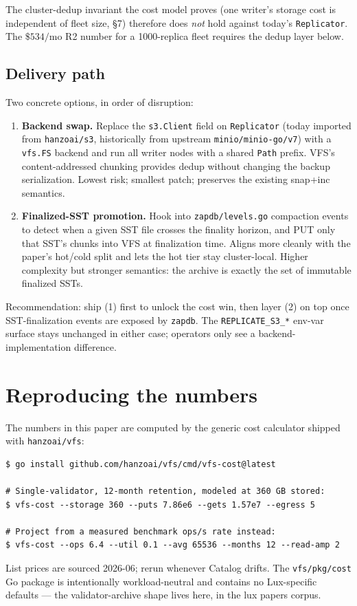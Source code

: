 \documentclass[11pt,a4paper]{article}
\begin{document}
\noindent
The cluster-dedup invariant the cost model proves (one writer's
storage cost is independent of fleet size, \S7) therefore does
\emph{not} hold against today's \texttt{Replicator}. The $\$534/\text{mo}$
R2 number for a 1000-replica fleet requires the dedup layer below.

\subsection*{Delivery path}

Two concrete options, in order of disruption:

\begin{enumerate}
  \item \textbf{Backend swap.} Replace the \texttt{s3.Client} field
    on \texttt{Replicator} (today imported from \texttt{hanzoai/s3},
    historically from upstream \texttt{minio/minio-go/v7}) with a
    \texttt{vfs.FS} backend and run all writer nodes with a shared
    \texttt{Path} prefix. VFS's content-addressed chunking provides
    dedup without changing the backup serialization. Lowest risk;
    smallest patch; preserves the existing snap+inc semantics.
  \item \textbf{Finalized-SST promotion.} Hook into
    \texttt{zapdb/levels.go} compaction events to detect when a given
    SST file crosses the finality horizon, and PUT only that SST's
    chunks into VFS at finalization time. Aligns more cleanly with the
    paper's hot/cold split and lets the hot tier stay
    cluster-local. Higher complexity but stronger semantics: the
    archive is exactly the set of immutable finalized SSTs.
\end{enumerate}

\noindent
Recommendation: ship (1) first to unlock the cost win, then layer (2)
on top once SST-finalization events are exposed by \texttt{zapdb}. The
\texttt{REPLICATE\_S3\_*} env-var surface stays unchanged in either case;
operators only see a backend-implementation difference.

\section*{Reproducing the numbers}

The numbers in this paper are computed by the generic cost calculator
shipped with \texttt{hanzoai/vfs}:

\begin{lstlisting}
$ go install github.com/hanzoai/vfs/cmd/vfs-cost@latest

# Single-validator, 12-month retention, modeled at 360 GB stored:
$ vfs-cost --storage 360 --puts 7.86e6 --gets 1.57e7 --egress 5

# Project from a measured benchmark ops/s rate instead:
$ vfs-cost --ops 6.4 --util 0.1 --avg 65536 --months 12 --read-amp 2
\end{lstlisting}

\noindent
List prices are sourced 2026-06; rerun whenever Catalog drifts. The
\texttt{vfs/pkg/cost} Go package is intentionally workload-neutral and
contains no Lux-specific defaults --- the validator-archive shape lives
here, in the lux papers corpus.
\end{document}
